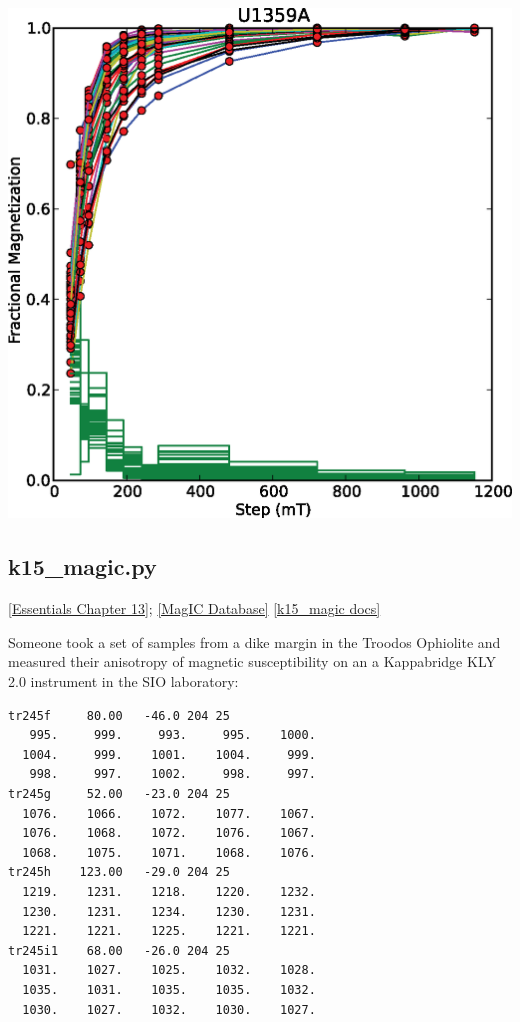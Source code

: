 \documentclass[11pt]{book}
\begin{document}
{{\includegraphics[width=15cm]{EPSfiles/irmaq_magic.eps}

%
\subsection{k15\_magic.py}
\href{http://earthref.org/MAGIC/books/Tauxe/Essentials/WebBook3ch13.html#ch13}{[Essentials Chapter 13]};
\href{#MagICDatabase}{[MagIC Database]}
\href{https://github.com/PmagPy/PmagPy/blob/master/programs/k15_magic.py}{[k15\_magic docs]}


Someone took a set of samples from a dike margin in the Troodos Ophiolite and measured their anisotropy of magnetic susceptibility on an a Kappabridge KLY 2.0 instrument in the SIO laboratory:

\begin{verbatim}
tr245f     80.00   -46.0 204 25
   995.     999.     993.     995.    1000.
  1004.     999.    1001.    1004.     999.
   998.     997.    1002.     998.     997.
tr245g     52.00   -23.0 204 25
  1076.    1066.    1072.    1077.    1067.
  1076.    1068.    1072.    1076.    1067.
  1068.    1075.    1071.    1068.    1076.
tr245h    123.00   -29.0 204 25
  1219.    1231.    1218.    1220.    1232.
  1230.    1231.    1234.    1230.    1231.
  1221.    1221.    1225.    1221.    1221.
tr245i1    68.00   -26.0 204 25
  1031.    1027.    1025.    1032.    1028.
  1035.    1031.    1035.    1035.    1032.
  1030.    1027.    1032.    1030.    1027.
  \end{verbatim}

}}
\end{document}
